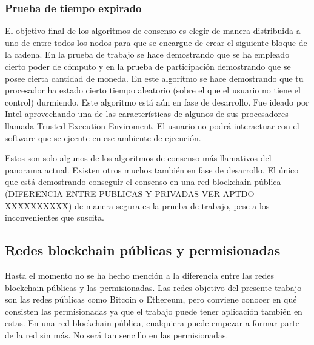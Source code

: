 \subsubsection{Prueba de tiempo expirado}
El objetivo final de los algoritmos de consenso es elegir de manera distribuida a uno de entre todos los nodos para que se encargue de crear el siguiente bloque de la cadena. En la prueba de trabajo se hace demostrando que se ha empleado cierto poder de cómputo y en la prueba de participación demostrando que se posee cierta cantidad de moneda. En este algoritmo se hace demostrando que tu procesador ha estado cierto tiempo aleatorio (sobre el que el usuario no tiene el control) durmiendo. Este algoritmo está aún en fase de desarrollo. Fue ideado por Intel aprovechando una de las características de algunos de sus procesadores llamada Trusted Execution Enviroment. El usuario no podrá interactuar con el software que se ejecute en ese ambiente de ejecución. \newline

Estos son solo algunos de los algoritmos de consenso más llamativos del panorama actual. Existen otros muchos también en fase de desarrollo. El único que está demostrando conseguir el consenso en una red blockchain pública (DIFERENCIA ENTRE PUBLICAS Y PRIVADAS VER APTDO XXXXXXXXXX) de manera segura es la prueba de trabajo, pese a los inconvenientes que suscita.

\subsection{Redes blockchain públicas y permisionadas}
Hasta el momento no se ha hecho mención a la diferencia entre las redes blockchain públicas y las permisionadas. Las redes objetivo del presente trabajo son las redes públicas como Bitcoin o Ethereum, pero conviene conocer en qué consisten las permisionadas ya que el trabajo puede tener aplicación también en estas. En una red blockchain pública, cualquiera puede empezar a formar parte de la red sin más. No será tan sencillo en las permisionadas. \newline

